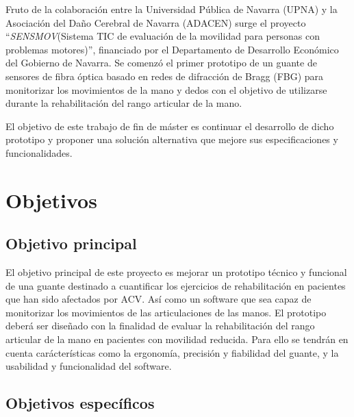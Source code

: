 Fruto de la colaboración entre la Universidad Pública de Navarra (UPNA) y la Asociación del Daño Cerebral de Navarra	(ADACEN) surge el proyecto ``\textit{SENSMOV}(Sistema TIC de evaluación de la movilidad para personas con problemas motores)'', financiado por el Departamento de Desarrollo Económico del Gobierno de Navarra. Se comenzó el primer prototipo de un guante de sensores de fibra óptica basado en redes de difracción de Bragg (FBG) para monitorizar los movimientos de la mano y dedos con el objetivo de utilizarse durante la rehabilitación del rango articular de la mano.


El objetivo de este trabajo de fin de máster es continuar el desarrollo de dicho prototipo y proponer una solución alternativa que mejore sus especificaciones y funcionalidades. 



\section{Objetivos}
\label{sec:objetivos1}
 

\subsection{Objetivo principal}
\label{sec:objPrinc1}

El objetivo principal de este proyecto es mejorar un prototipo técnico y funcional de una guante destinado a cuantificar los ejercicios de rehabilitación en pacientes que han sido afectados por ACV. Así como un software que sea capaz de monitorizar los movimientos de las articulaciones de las manos. El prototipo deberá ser diseñado con la finalidad de evaluar la rehabilitación del rango articular de la mano en pacientes con movilidad reducida. Para ello se tendrán en cuenta carácterísticas como la ergonomía, precisión y fiabilidad del guante, y la usabilidad y funcionalidad del software. 



\subsection{Objetivos específicos}
\label{sec:objEspec1}


